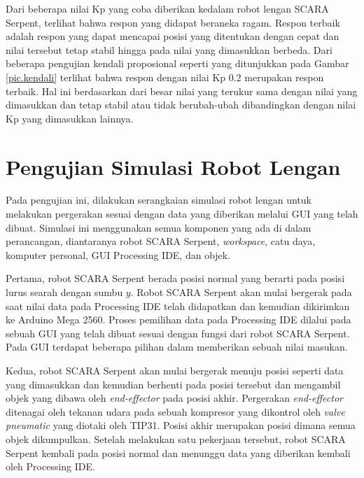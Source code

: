 Dari beberapa nilai Kp yang coba diberikan kedalam robot lengan SCARA Serpent, terlihat bahwa respon yang didapat beraneka ragam. Respon terbaik adalah respon yang dapat mencapai posisi yang ditentukan dengan cepat dan nilai tersebut tetap stabil hingga pada nilai yang dimasukkan berbeda. Dari beberapa pengujian kendali proposional seperti yang ditunjukkan pada Gambar \ref{pic.kendali} terlihat bahwa respon dengan nilai Kp 0.2 merupakan respon terbaik. Hal ini berdasarkan dari besar nilai yang terukur sama dengan nilai yang dimasukkan dan tetap stabil atau tidak berubah-ubah dibandingkan dengan nilai Kp yang dimasukkan lainnya.
\section{Pengujian Simulasi Robot Lengan}
Pada pengujian ini, dilakukan serangkaian simulasi robot lengan untuk melakukan pergerakan sesuai dengan data yang diberikan melalui GUI yang telah dibuat. Simulasi ini menggunakan semua komponen yang ada di dalam perancangan, diantaranya robot SCARA Serpent, \textit{workspace}, catu daya, komputer personal, GUI Processing IDE, dan objek.

Pertama, robot SCARA Serpent berada posisi normal yang berarti pada posisi lurus searah dengan sumbu $y$. Robot SCARA Serpent akan mulai bergerak pada saat nilai data pada Processing IDE telah didapatkan dan kemudian dikirimkan ke Arduino Mega 2560. Proses pemilihan data pada Processing IDE dilalui pada sebuah GUI yang telah dibuat sesuai dengan fungsi dari robot SCARA Serpent. Pada GUI terdapat beberapa pilihan dalam memberikan sebuah nilai masukan. 

Kedua, robot SCARA Serpent akan mulai bergerak menuju posisi seperti data yang dimasukkan dan kemudian berhenti pada posisi tersebut dan mengambil objek yang dibawa oleh \textit{end-effector} pada posisi akhir.  Pergerakan \textit{end-effector} ditenagai oleh tekanan udara pada sebuah kompresor yang dikontrol oleh\textit{ valve pneumatic} yang diotaki oleh TIP31. Posisi akhir merupakan posisi dimana semua objek dikumpulkan. Setelah melakukan satu pekerjaan tersebut, robot SCARA Serpent kembali pada posisi normal dan menunggu data yang diberikan kembali oleh Processing IDE.  


